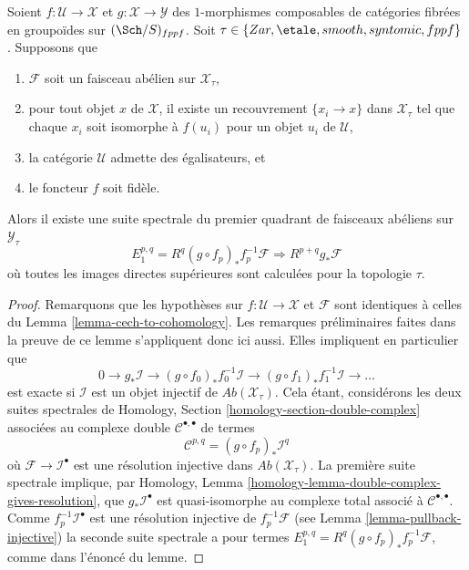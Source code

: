 \begin{lemma}
\label{lemma-cech-to-cohomology-relative}
Soient $f : \mathcal{U} \to \mathcal{X}$ et
$g : \mathcal{X} \to \mathcal{Y}$
des $1$-morphismes composables de catégories fibrées
en groupoïdes sur $(\Sch/S)_{fppf}$. Soit
$\tau \in \{Zar, \etale, smooth, syntomic, \linebreak[0] fppf\}$.
Supposons que
\begin{enumerate}
\item $\mathcal{F}$ soit un faisceau abélien sur $\mathcal{X}_\tau$,
\item pour tout objet $x$ de $\mathcal{X}$, il existe un recouvrement
$\{x_i \to x\}$ dans $\mathcal{X}_\tau$ tel que chaque $x_i$ soit isomorphe
à $f(u_i)$ pour un objet $u_i$ de $\mathcal{U}$,
\item la catégorie $\mathcal{U}$ admette des égalisateurs, et
\item le foncteur $f$ soit fidèle.
\end{enumerate}
Alors il existe une suite spectrale du premier quadrant de faisceaux abéliens
sur $\mathcal{Y}_\tau$
$$
E_1^{p, q} = R^q(g \circ f_p)_*f_p^{-1}\mathcal{F}
\Rightarrow
R^{p + q}g_*\mathcal{F}
$$
où toutes les images directes supérieures sont calculées pour la topologie $\tau$.
\end{lemma}

\begin{proof}
Remarquons que les hypothèses sur $f : \mathcal{U} \to \mathcal{X}$
et $\mathcal{F}$ sont identiques à celles du
Lemma \ref{lemma-cech-to-cohomology}.
Les remarques préliminaires faites dans la preuve de ce lemme
s'appliquent donc ici aussi. Elles impliquent en particulier que
$$
0 \to g_*\mathcal{I} \to
(g \circ f_0)_*f_0^{-1}\mathcal{I} \to
(g \circ f_1)_*f_1^{-1}\mathcal{I} \to \ldots
$$
est exacte si $\mathcal{I}$ est un objet injectif de
$\textit{Ab}(\mathcal{X}_\tau)$.
Cela étant, considérons les deux suites spectrales de
Homology, Section \ref{homology-section-double-complex}
associées au complexe double $\mathcal{C}^{\bullet, \bullet}$ de termes
$$
\mathcal{C}^{p, q} = (g \circ f_p)_*\mathcal{I}^q
$$
où $\mathcal{F} \to \mathcal{I}^\bullet$ est une résolution injective
dans $\textit{Ab}(\mathcal{X}_\tau)$. La première suite spectrale implique, par
Homology, Lemma \ref{homology-lemma-double-complex-gives-resolution},
que $g_*\mathcal{I}^\bullet$ est quasi-isomorphe au complexe total
associé à $\mathcal{C}^{\bullet, \bullet}$.
Comme $f_p^{-1}\mathcal{I}^\bullet$ est une résolution injective de
$f_p^{-1}\mathcal{F}$ (see
Lemma \ref{lemma-pullback-injective})
la seconde suite spectrale a pour termes
$E_1^{p, q} = R^q(g \circ f_p)_*f_p^{-1}\mathcal{F}$, comme dans l'énoncé
du lemme.
\end{proof}

